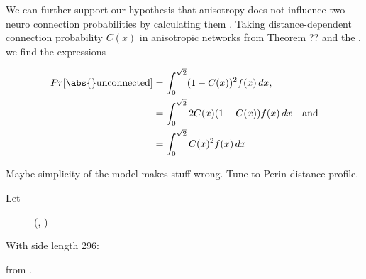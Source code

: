 We can further support our hypothesis that anisotropy does not
influence two neuro connection probabilities by calculating them
. Taking distance-dependent connection probability $C(x)$ in
anisotropic networks from Theorem ?? and the , we find the expressions

\begin{align*}
Pr[\abs{}\mathrm{unconnected}] & = \int_0^{\sqrt{2}} (1-C(x))^2 f(x)\,
dx, \\
& = \int_0^{\sqrt{2}} 2 C(x) (1-C(x)) f(x) \, dx \quad \mathrm{and}\\
& = \int_0^{\sqrt{2}} C(x)^2 f(x) \, dx \\
\end{align*}





Maybe simplicity of the model makes stuff wrong. Tune to Perin
distance profile.

Let 


\begin{figure}[htp]
  \centering
  \vspace{-0.15cm}
  \caption{ (, )} %
  \label{fig:determine_side_length}
\end{figure}

With side length 296:


from .


